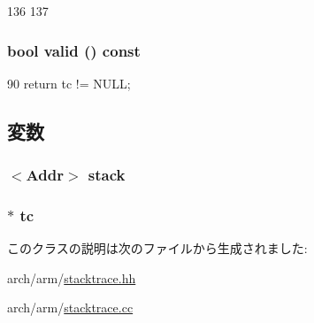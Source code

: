 \begin{DoxyCode}
136     {
137     }
\end{DoxyCode}
\hypertarget{classArmISA_1_1StackTrace_a8d985300b138b6c5556ab17ed4df3b38}{
\subsubsection[{valid}]{\setlength{\rightskip}{0pt plus 5cm}bool valid () const}}
\label{classArmISA_1_1StackTrace_a8d985300b138b6c5556ab17ed4df3b38}



\begin{DoxyCode}
90 { return tc != NULL; }
\end{DoxyCode}


\subsection{変数}
\hypertarget{classArmISA_1_1StackTrace_a8be39169db4f31c77f5188de23c602f1}{
\subsubsection[{stack}]{$<${\bf Addr}$>$ {\bf stack}}}
\label{classArmISA_1_1StackTrace_a8be39169db4f31c77f5188de23c602f1}
\hypertarget{classArmISA_1_1StackTrace_a4455a4759e69e5ebe68ae7298cbcc37d}{
\subsubsection[{tc}]{$\ast$ {\bf tc}}}
\label{classArmISA_1_1StackTrace_a4455a4759e69e5ebe68ae7298cbcc37d}


このクラスの説明は次のファイルから生成されました:\begin{DoxyCompactItemize}
\item 
arch/arm/\hyperlink{arm_2stacktrace_8hh}{stacktrace.hh}\item 
arch/arm/\hyperlink{arm_2stacktrace_8cc}{stacktrace.cc}\end{DoxyCompactItemize}
